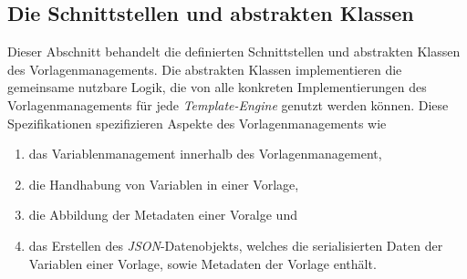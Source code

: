 \subsection{Die Schnittstellen und abstrakten Klassen}
Dieser Abschnitt behandelt die definierten Schnittstellen und abstrakten Klassen des Vorlagenmanagements. Die abstrakten Klassen implementieren die gemeinsame nutzbare Logik, die von alle konkreten Implementierungen des Vorlagenmanagements für jede \emph{Template-Engine} genutzt werden können. Diese Spezifikationen spezifizieren Aspekte des Vorlagenmanagements wie
\begin{enumerate}
	\item das Variablenmanagement innerhalb des Vorlagenmanagement,
	\item die Handhabung von Variablen in einer Vorlage,
	\item die Abbildung der Metadaten einer Voralge und 
	\item das Erstellen des \emph{JSON}-Datenobjekts, welches die serialisierten Daten der Variablen einer Vorlage, sowie Metadaten der Vorlage enthält.
\end{enumerate}

